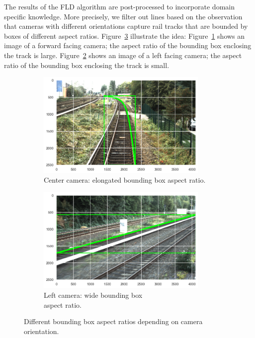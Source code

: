 \documentclass[Master,MDS,english]{BASE/twbook} %
\begin{document}
The results of the FLD algorithm are post-processed to incorporate domain specific knowledge. More precisely, we filter out lines based on the observation that cameras with different orientations capture rail tracks that are bounded by boxes of different aspect ratios. Figure~\ref{fig:bb_examples} illustrate the idea: Figure~\ref{fig:bb_long} shows an image of a forward facing camera; the aspect ratio of the bounding box enclosing the track is large.  Figure~\ref{fig:bb_wide} shows an image of a left facing camera; the aspect ratio of the bounding box enclosing the track is small.


\begin{figure}[H]
\centering
\begin{subfigure}[t]{.5\textwidth}
  \centering
  \includegraphics[width=0.9\textwidth]{images/datasets/db/aspect_ratio_long}
  \caption{Center camera: elongated bounding box aspect ratio.}
   \label{fig:bb_long}
\end{subfigure}%
\begin{subfigure}[t]{.5\textwidth}
  \centering
  \includegraphics[width=0.9\textwidth]{images/datasets/db/aspect_ratio_wide}
  \caption{Left camera: wide bounding box \\ aspect ratio. }
  \label{fig:bb_wide}
\end{subfigure}
\caption{Different bounding box aspect ratios depending on camera orientation.}
\label{fig:bb_examples}
\end{figure}
\end{document}

